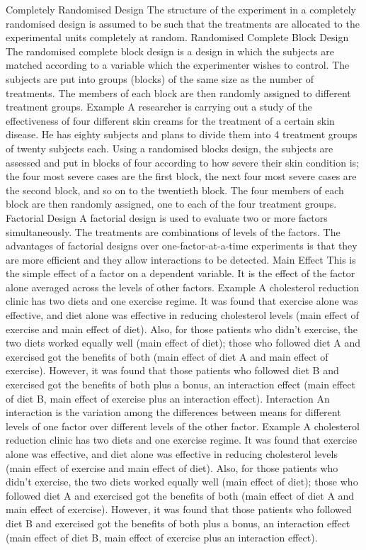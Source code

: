 \begin{itemize}
Completely Randomised Design 
The structure of the experiment in a completely randomised design is assumed to be such that the treatments are allocated to the experimental units completely at random.
Randomised Complete Block Design 
The randomised complete block design is a design in which the subjects are matched according to a variable which the experimenter wishes to control. The subjects are put into groups (blocks) of the same size as the number of treatments. The members of each block are then randomly assigned to different treatment groups.
Example 
A researcher is carrying out a study of the effectiveness of four different skin creams for the treatment of a certain skin disease. He has eighty subjects and plans to divide them into 4 treatment groups of twenty subjects each. Using a randomised blocks design, the subjects are assessed and put in blocks of four according to how severe their skin condition is; the four most severe cases are the first block, the next four most severe cases are the second block, and so on to the twentieth block. The four members of each block are then randomly assigned, one to each of the four treatment groups.
Factorial Design 
A factorial design is used to evaluate two or more factors simultaneously. The treatments are combinations of levels of the factors. The advantages of factorial designs over one-factor-at-a-time experiments is that they are more efficient and they allow interactions to be detected.
Main Effect 
This is the simple effect of a factor on a dependent variable. It is the effect of the factor alone averaged across the levels of other factors.
Example 
A cholesterol reduction clinic has two diets and one exercise regime. It was found that exercise alone was effective, and diet alone was effective in reducing cholesterol levels (main effect of exercise and main effect of diet). Also, for those patients who didn't exercise, the two diets worked equally well (main effect of diet); those who followed diet A and exercised got the benefits of both (main effect of diet A and main effect of exercise). However, it was found that those patients who followed diet B and exercised got the benefits of both plus a bonus, an interaction effect (main effect of diet B, main effect of exercise plus an interaction effect).
Interaction 
An interaction is the variation among the differences between means for different levels of one factor over different levels of the other factor.
Example 
A cholesterol reduction clinic has two diets and one exercise regime. It was found that exercise alone was effective, and diet alone was effective in reducing cholesterol levels (main effect of exercise and main effect of diet). Also, for those patients who didn't exercise, the two diets worked equally well (main effect of diet); those who followed diet A and exercised got the benefits of both (main effect of diet A and main effect of exercise). However, it was found that those patients who followed diet B and exercised got the benefits of both plus a bonus, an interaction effect (main effect of diet B, main effect of exercise plus an interaction effect).

\end{itemize}
